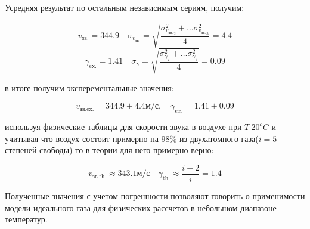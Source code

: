 \documentclass[10pt]{article}
\begin{document}
    Усредняя результат по остальным независимым сериям, получим:

    \begin{equation}
        v_\text{зв.} = 344.9 \quad \sigma_{v_\text{зв.}} = \sqrt{\frac{\sigma_{{v_\text{зв.}}_2}^2 + \dots \sigma_{{v_\text{зв.}}_5}^2}{4}} = 4.4 
    \end{equation}
    \begin{equation}
        \gamma_\text{ex.} = 1.41 \quad \sigma_\gamma = \sqrt{\frac{\sigma_{\gamma_2}^2 + \dots \sigma_{\gamma_5}^2}{4}} = 0.09 
    \end{equation}

    в итоге получим эксперементальные значения:

    \begin{equation}
        v_\text{зв.ex.} = 344.9 \pm 4.4 \text{м/с}, \quad \gamma_{ex.} = 1.41 \pm 0.09
    \end{equation}

    используя физические таблицы для скорости звука в воздухе при $T ~ 20^o C$ и
    учитывая что воздух состоит примерно на 98\% из двухатомного газа($i = 5$ степеней свободы) то в теории для него примерно верно:

    \begin{equation}
         v_\text{зв.th.} \approx 343.1 \text{м/с} \quad \gamma_\text{th.} \approx \frac{i+2}{i} = 1.4
    \end{equation}

    Полученные значения с учетом погрешности позволяют говорить о применимости модели идеального газа для физических рассчетов в небольшом диапазоне температур.
\end{document}
